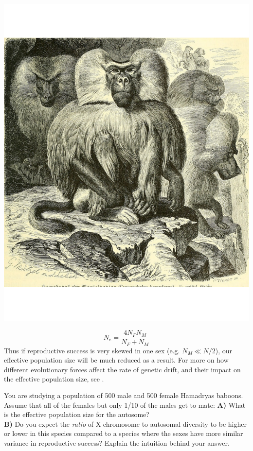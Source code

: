 \begin{marginfigure}
\begin{center}
\includegraphics[width= 0.7 \textwidth]{illustration_images/Genetic_drift/Hamadryas_baboon/Hamadryas_baboon.pdf}
\end{center}
\caption{Male Hamadryas baboons. Up to ten females live in a harem with a single male.  %
} \label{fig:Hamadryas_baboon}
\end{marginfigure}

\begin{equation}
N_e = \frac{4N_FN_M}{N_F+N_M}
\end{equation}
Thus if reproductive success is very skewed in one sex (e.g. $N_M \ll
N/2$), our effective population size will be much reduced as a result. For more on how different evolutionary forces affect the rate of genetic drift, and their impact on the effective population size, see \citet{charlesworth:09}.\\

\begin{question}
You are studying a population of 500 male and 500 female Hamadryas baboons. Assume that all of the females but only 1/10 of the males get to mate:
{\bf A)} What is the effective population size for the autosome?\\
{\bf B)} Do you expect the {\it ratio} of X-chromosome to autosomal diversity to be higher or lower in this species compared to a species where the sexes have more similar variance in reproductive success? Explain the intuition behind your answer.
 \end{question}

